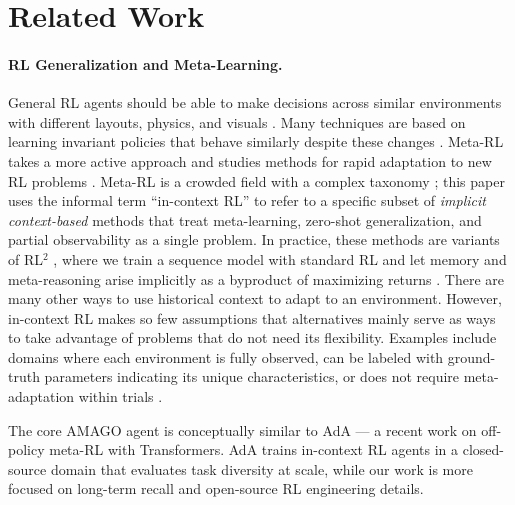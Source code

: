 \section{Related Work}
\label{sec:related}

\vspace{-2mm}
\paragraph{RL Generalization and Meta-Learning.} General RL agents should be able to make decisions across similar environments with different layouts, physics, and visuals \cite{cobbe2020leveraging, song2019observational, packer2018assessing, zhang2018dissection}. Many techniques are based on learning invariant policies that behave similarly despite these changes \cite{kirk2022survey}. Meta-RL takes a more active approach and studies methods for rapid adaptation to new RL problems \cite{schmidhuber1987evolutionary}. Meta-RL is a crowded field with a complex taxonomy \cite{beck2023survey}; this paper uses the informal term ``in-context RL'' to refer to a specific subset of \textit{implicit context-based} methods that treat meta-learning, zero-shot generalization, and partial observability as a single problem. In practice, these methods are variants of RL$^2$ \cite{duan2016rl, wang2016learning}, where we train a sequence model with standard RL and let memory and meta-reasoning arise implicitly as a byproduct of maximizing returns \cite{botvinick2019reinforcement, mishra2017simple, stadie2018some, ni2022recurrent, ortega2019meta, fakoor2019meta, team2023human}. There are many other ways to use historical context to adapt to an environment. However, in-context RL makes so few assumptions that alternatives mainly serve as ways to take advantage of problems that do not need its flexibility. Examples include domains where each environment is fully observed, can be labeled with ground-truth parameters indicating its unique characteristics, or does not require meta-adaptation within trials \cite{humplik2019meta, kamienny2020learning, liu2021decoupling, rakelly2019efficient, ren2020ocean, wang2021improving}. 

The core AMAGO agent is conceptually similar to AdA \cite{team2023human} --- a recent work on off-policy meta-RL with Transformers. AdA trains in-context RL agents in a closed-source domain that evaluates task diversity at scale, while our work is more focused on long-term recall and open-source RL engineering details. 


\vspace{-2mm}
